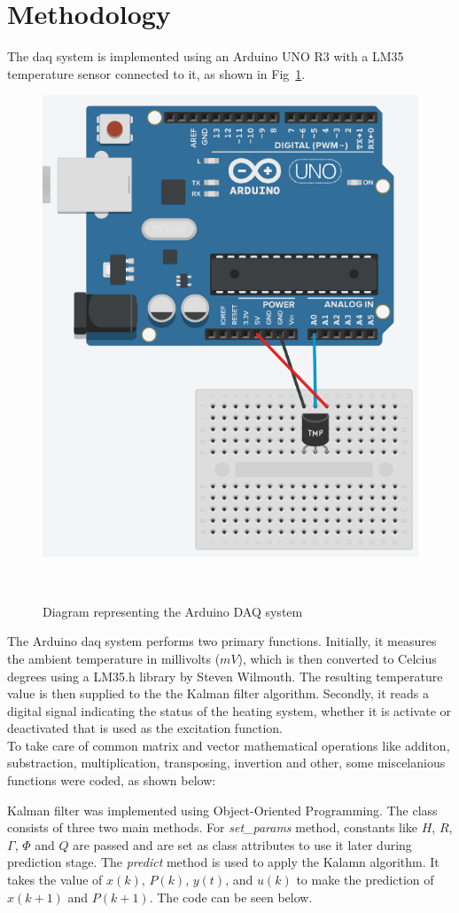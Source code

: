 \section{Methodology}
The \acrshort{daq} system is implemented using an Arduino UNO R3 with a LM35 temperature sensor connected to it, as shown in Fig~\ref{fig:arduino_daq}.

\begin{figure}[H]
    \centering
    \includegraphics[width=0.6\linewidth]{figures/arduino_daq.png}
    \caption{Diagram representing the Arduino DAQ system}
~\label{fig:arduino_daq}
\end{figure}

The Arduino \acrshort{daq} system performs two primary functions. Initially, it measures the ambient temperature in millivolts ($mV$), which is then converted to Celcius degrees using a LM35.h library by Steven Wilmouth. The resulting temperature value is then supplied to the the Kalman filter algorithm. Secondly, it reads a digital signal indicating the status of the heating system, whether it is activate or deactivated that is used as the excitation function. \\

To take care of common matrix and vector mathematical operations like additon, substraction, multiplication, transposing, invertion and other, some miscelanious functions were coded, as shown below:



Kalman filter was implemented using Object-Oriented Programming. The class consists of three two main methods. For \textit{set\_params} method, constants like $H$, $R$, $\Gamma$, $\Phi$ and $Q$ are passed and are set as class attributes to use it later during prediction stage. The \textit{predict} method is used to apply the Kalamn algorithm. It takes the value of $x(k)$, $P(k)$, $y(t)$, and $u(k)$ to make the prediction of $x(k+1)$ and $P(k+1)$. The code can be seen below.

